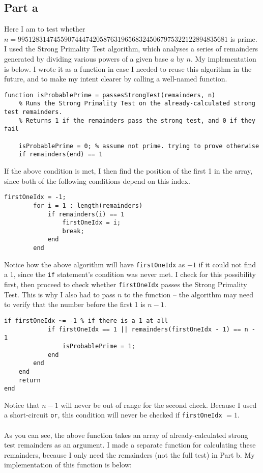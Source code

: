 \documentclass[11pt]{article}
\begin{document}
\subsection*{Part a}
Here I am to test whether $n = 99512831474559074447420587631965683245067975322122894835681$ is prime. I used the Strong Primality Test algorithm, which analyses a series of remainders generated by dividing various powers of a given base $a$ by $n$. My implementation is below. I wrote it as a function in case I needed to reuse this algorithm in the future, and to make my intent clearer by calling a well-named function.
\begin{Verbatim}[xleftmargin=0.5in]
function isProbablePrime = passesStrongTest(remainders, n)
    % Runs the Strong Primality Test on the already-calculated strong test remainders.
    % Returns 1 if the remainders pass the strong test, and 0 if they fail

    isProbablePrime = 0; % assume not prime. trying to prove otherwise
    if remainders(end) == 1
\end{Verbatim}
If the above condition is met, I then find the position of the first 1 in the array, since both of the following conditions depend on this index.
\begin{Verbatim}[xleftmargin=0.5in]
        firstOneIdx = -1;
        for i = 1 : length(remainders)
            if remainders(i) == 1
                firstOneIdx = i;
                break;
            end
        end
\end{Verbatim}
Notice how the above algorithm will have \texttt{firstOneIdx} as $-1$ if it could not find a 1, since the \texttt{if} statement's condition was never met. I check for this possibility first, then proceed to check whether \texttt{firstOneIdx} passes the Strong Primality Test. This is why I also had to pass $n$ to the function -- the algorithm may need to verify that the number before the first 1 is $n - 1$.
\begin{Verbatim}[xleftmargin=0.5in]
        if firstOneIdx ~= -1 % if there is a 1 at all
            if firstOneIdx == 1 || remainders(firstOneIdx - 1) == n - 1
                isProbablePrime = 1;
            end
        end
    end
    return
end
\end{Verbatim}
Notice that $n - 1$ will never be out of range for the second check. Because I used a short-circuit \texttt{or}, this condition will never be checked if \texttt{firstOneIdx} $= 1$. \\  \\
As you can see, the above function takes an array of already-calculated strong test remainders as an argument. I made a separate function for calculating these remainders, because I only need the remainders (not the full test) in Part b. My implementation of this function is below:
\end{document}
